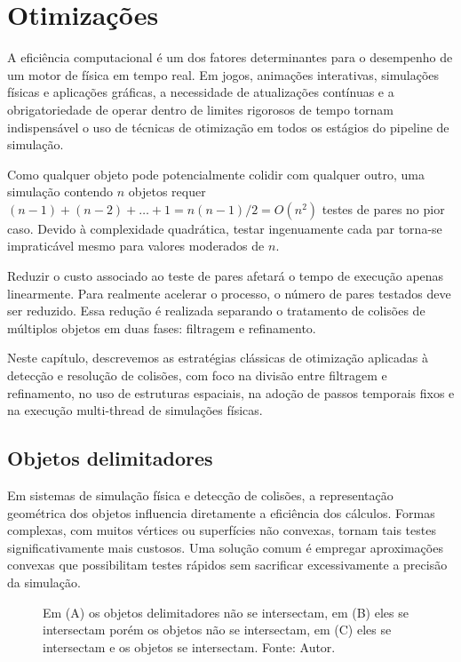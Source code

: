 \chapter{Otimizações}

A eficiência computacional é um dos fatores determinantes para o desempenho de um motor de física em tempo real. Em jogos, animações interativas, simulações físicas e aplicações gráficas, a necessidade de atualizações contínuas e a obrigatoriedade de operar dentro de limites rigorosos de tempo tornam indispensável o uso de técnicas de otimização em todos os estágios do pipeline de simulação.

Como qualquer objeto pode potencialmente colidir com qualquer outro, uma simulação contendo $n$ objetos requer $(n-1)+(n-2)+\dots+1 = n(n-1)/2 = O(n^2)$ testes de pares no pior caso. Devido à complexidade quadrática, testar ingenuamente cada par torna-se impraticável mesmo para valores moderados de $n$.

Reduzir o custo associado ao teste de pares afetará o tempo de execução apenas linearmente. Para realmente acelerar o processo, o número de pares testados deve ser reduzido. Essa redução é realizada separando o tratamento de colisões de múltiplos objetos em duas fases: filtragem e refinamento.

Neste capítulo, descrevemos as estratégias clássicas de otimização aplicadas à detecção e resolução de colisões, com foco na divisão entre filtragem e refinamento, no uso de estruturas espaciais, na adoção de passos temporais fixos e na execução multi-thread de simulações físicas.

\section{Objetos delimitadores}

Em sistemas de simulação física e detecção de colisões, a representação geométrica dos objetos influencia diretamente a eficiência dos cálculos. Formas complexas, com muitos vértices ou superfícies não convexas, tornam tais testes significativamente mais custosos. Uma solução comum é empregar aproximações convexas que possibilitam testes rápidos sem sacrificar excessivamente a precisão da simulação.

\begin{figure}[htb]
	\centering
	
	\caption{Em (A) os objetos delimitadores não se intersectam, em (B) eles se intersectam porém os objetos não se intersectam, em (C) eles se intersectam e os objetos se intersectam. Fonte: Autor.}
	\label{fig:fecho-convexo-interseccao}
\end{figure}

